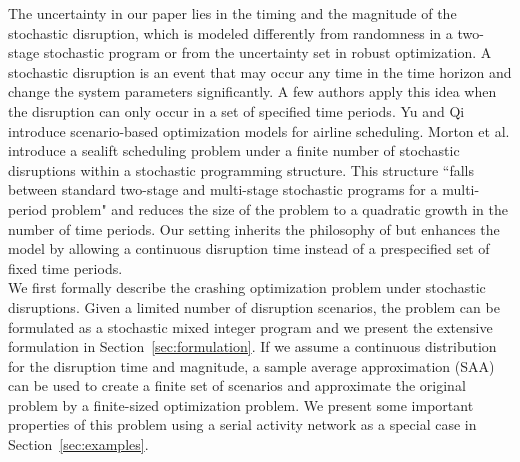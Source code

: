 \documentclass[11pt]{article}
\begin{document}
	The uncertainty in our paper lies in the timing and the magnitude of the stochastic disruption, which is modeled differently from randomness in a two-stage stochastic program or from the uncertainty set in robust optimization. A stochastic disruption is an event that may occur any time in the time horizon and change the system parameters significantly. A few authors apply this idea when the disruption can only occur in a set of specified time periods. Yu and Qi \cite{yu2004disruptionmgt} introduce scenario-based optimization models for airline scheduling. Morton et al. \cite{morton2009sealift} introduce a sealift scheduling problem under a finite number of stochastic disruptions within a stochastic programming structure. This structure ``falls between standard two-stage and multi-stage stochastic programs for a multi-period problem" and reduces the size of the problem to a quadratic growth in the number of time periods. Our setting inherits the philosophy of \cite{morton2009sealift} but enhances the model by allowing a continuous disruption time instead of a prespecified set of fixed time periods. \\
	\newline
	We first formally describe the crashing optimization problem under stochastic disruptions. Given a limited number of disruption scenarios, the problem can be formulated as a stochastic mixed integer program and we present the extensive formulation in Section~\ref{sec:formulation}. If we assume a continuous distribution for the disruption time and magnitude, a sample average approximation (SAA) can be used to create a finite set of scenarios and approximate the original problem by a finite-sized optimization problem. We present some important properties of this problem using a serial activity network as a special case in Section~\ref{sec:examples}. 

	
\end{document}
